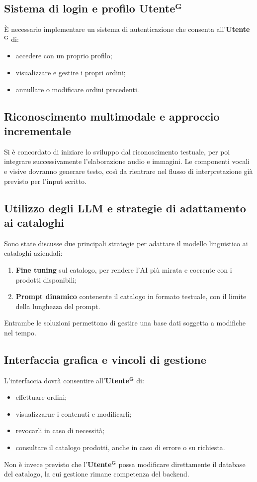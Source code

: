 \documentclass[a4paper,12pt]{article}
\newcommand{\term}[1]{\textbf{#1}$^\mathbf{G}$}
\begin{document}
\subsection{Sistema di login e profilo \texorpdfstring{\term{Utente}}{Utente}}
È necessario implementare un sistema di autenticazione che consenta all’\term{Utente} di:
\begin{itemize}
    \item accedere con un proprio profilo;
    \item visualizzare e gestire i propri ordini;
    \item annullare o modificare ordini precedenti.
\end{itemize}

\subsection{Riconoscimento multimodale e approccio incrementale}
Si è concordato di iniziare lo sviluppo dal riconoscimento testuale, per poi integrare successivamente l’elaborazione audio e immagini.  
Le componenti vocali e visive dovranno generare testo, così da rientrare nel flusso di interpretazione già previsto per l’input scritto.

\subsection{Utilizzo degli LLM e strategie di adattamento ai cataloghi}
Sono state discusse due principali strategie per adattare il modello linguistico ai cataloghi aziendali:
\begin{enumerate}
    \item \textbf{Fine tuning} sul catalogo, per rendere l’AI più mirata e coerente con i prodotti disponibili;
    \item \textbf{Prompt dinamico} contenente il catalogo in formato testuale, con il limite della lunghezza del prompt.
\end{enumerate}
Entrambe le soluzioni permettono di gestire una base dati soggetta a modifiche nel tempo.

\subsection{Interfaccia grafica e vincoli di gestione}
L’interfaccia dovrà consentire all’\term{Utente} di:
\begin{itemize}
    \item effettuare ordini;
    \item visualizzarne i contenuti e modificarli;
    \item revocarli in caso di necessità;
    \item consultare il catalogo prodotti, anche in caso di errore o su richiesta.
\end{itemize}
Non è invece previsto che l’\term{Utente} possa modificare direttamente il database del catalogo, la cui gestione rimane competenza del backend.
\end{document}
